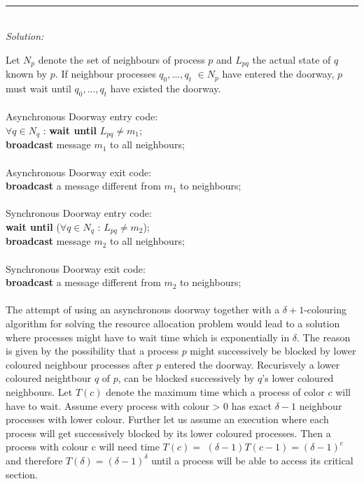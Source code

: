 \documentclass[a4paper]{article}
\newcommand{\horrule}[1]{\rule{\linewidth}{#1}} %
\newcommand{\oklarhet}[1]{%
  \noindent\fbox{\parbox[b][4em][t]{\textwidth}{\color{red}#1} }%
}
\newcommand{\solution}[1]{\\\horrule{0.5pt}\\[3pt]\textit{Solution: }\\[0.1cm]\begin{minipage}{\textwidth}#1\end{minipage}}
\begin{document}
\oklarhet{Unsure of the complexity analysis}
%
\solution{
  Let $N_p$ denote the set of neighbours of process $p$ and $L_{pq}$ the
  actual state of $q$ known by $p$. If neighbour processes $q_0,...,q_t$
  $\in N_p$ have entered the doorway, $p$ must wait until $q_0,...,q_t$ 
  have existed the doorway. \\ \\
  Asynchronous Doorway entry code:\\
  $\forall q \in N_q$ : \textbf{wait until} $L_{pq} \neq m_1$;\\
  \textbf{broadcast} message $m_1$ to all neighbours;\\ \\
  Asynchronous Doorway exit code: \\
  \textbf{broadcast} a message different from $m_1$ to neighbours;\\ \\
  Synchronous Doorway entry code:\\
  \textbf{wait until} ($\forall q \in N_q$ : $L_{pq} \neq m_2$);\\
  \textbf{broadcast} message $m_2$ to all neighbours;\\ \\
  Synchronous Doorway exit code:\\
  \textbf{broadcast} a message different from $m_2$ to neighbours;\\ \\
  The attempt of using an asynchronous doorway together with a $\delta +1$-colouring
  algorithm for solving the resource allocation problem would lead to a solution where
  processes might have to wait time which is exponentially in $\delta$. The reason 
  is given by the possibility that a process $p$ might successively be blocked by 
  lower coloured neighbour processes after $p$ entered the doorway. Recurisvely a lower
  coloured neightbour $q$ of $p$, can be blocked successively by $q$'s lower coloured
  neighbours. Let $T(c)$ denote the maximum time which a process of color $c$ will have
  to wait. Assume every process with colour > 0 has exact $\delta - 1$ neighbour processes
  with lower colour. Further let us assume an execution where each process will get successively
  blocked by its lower coloured processes. Then a process with colour c will need time $T(c) =$
  $(\delta-1)T(c-1)=(\delta-1)^c$ and therefore $T(\delta)=(\delta-1)^\delta$ until a process
  will be able to access its critical section.
}
%
\end{document}
